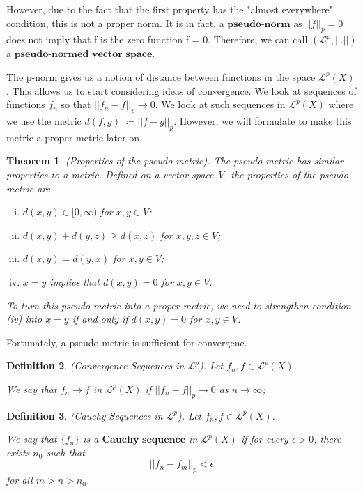 \documentclass[twoside]{article}
\newcounter{lecnum}
\newtheorem{theorem}{Theorem}[lecnum]
\newtheorem{definition}[theorem]{Definition}
\begin{document}
However, due to the fact that the first property has the "almost everywhere" condition, this is not a proper norm. It is in fact, a $\textbf{pseudo-norm}$ as $||f||_p = 0$ does not imply that f is the zero function f = 0. Therefore, we can call $( \mathcal{L}^p, ||.||)$ a $\textbf{pseudo-normed vector space}$.

The p-norm gives us a notion of distance between functions in the space $\mathcal{L}^p(X)$. This allows us to start considering ideas of convergence. We look at sequences of functions $f_n$ so that $||f_n - f||_p \rightarrow 0$.  We look at such sequences in $\mathcal{L}^p(X)$ where we use the metric $d(f,g) \; \coloneqq ||f - g||_p$. However, we will formulate to make this metric a proper metric later on. 

\begin{theorem}(Properties of the pseudo metric). The pseudo metric has similar properties to a metric. Defined on a vector space V, the properties of the pseudo metric are
\begin{enumerate}[(i)]
    \item $d(x,y) \in [0, \infty)$ for $x,y \in V$;
    \item $d(x,y) + d(y,z) \geq d(x,z)$ for $x,y,z \in V$;
    \item $d(x,y) = d(y,x)$ for $x,y \in V$;
    \item $x = y$ implies that $d(x,y) = 0$ for $x,y \in V$.
\end{enumerate}

To turn this pseudo metric into a proper metric, we need to strengthen condition (iv) into $x = y$ if and only if $d(x,y) = 0$ for $x,y \in V$.
\end{theorem}

Fortunately, a pseudo metric is sufficient for convergene. 
\begin{definition}(Convergence Sequences in $\mathcal{L}^p$). Let $f_n, f \in \mathcal{L}^p(X)$. 

We say that $f_n \rightarrow f$ in $\mathcal{L}^p(X)$ if $||f_n - f||_p \rightarrow 0$ as $n \rightarrow \infty$;
\end{definition}

\begin{definition}(Cauchy Sequences in $\mathcal{L}^p$). Let $f_n, f \in \mathcal{L}^p(X)$. 

 We say that $\{f_n\}$ is a $\textbf{Cauchy sequence}$ in $\mathcal{L}^p(X)$ if for every $\epsilon > 0$, there exists $n_0$ such that
  $$
  ||f_n - f_m||_p < \epsilon
  $$
  for all $m > n > n_0$.
\end{definition}
\end{document}
